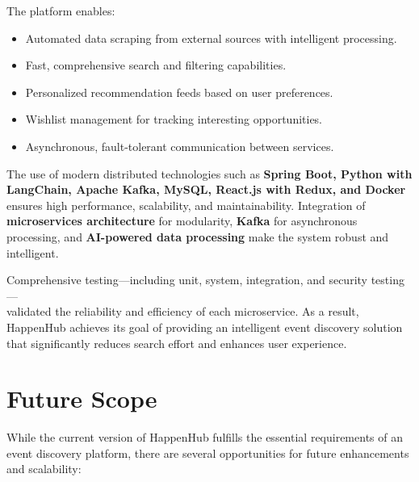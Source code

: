 \documentclass[12pt,a4paper]{report}
\begin{document}
The platform enables:
\begin{itemize}
    \item Automated data scraping from external sources with intelligent processing.
    \item Fast, comprehensive search and filtering capabilities.
    \item Personalized recommendation feeds based on user preferences.
    \item Wishlist management for tracking interesting opportunities.
    \item Asynchronous, fault-tolerant communication between services.
\end{itemize}

The use of modern distributed technologies such as \textbf{Spring Boot, Python
    with \\ LangChain, Apache Kafka, MySQL, React.js with Redux, and Docker} ensures
high performance, scalability, and maintainability. Integration of
\textbf{microservices architecture} for modularity, \textbf{Kafka} for
asynchronous processing, and \textbf{AI-powered data processing} make the
system robust and intelligent.

Comprehensive testing—including unit, system, integration, and security
testing— \\ validated the reliability and efficiency of each microservice. As a
result, HappenHub achieves its goal of providing an intelligent event discovery
solution that significantly reduces search effort and enhances user experience.

\section{Future Scope}

While the current version of HappenHub fulfills the essential requirements of
an event discovery platform, there are several opportunities for future
enhancements and scalability:
\end{document}
